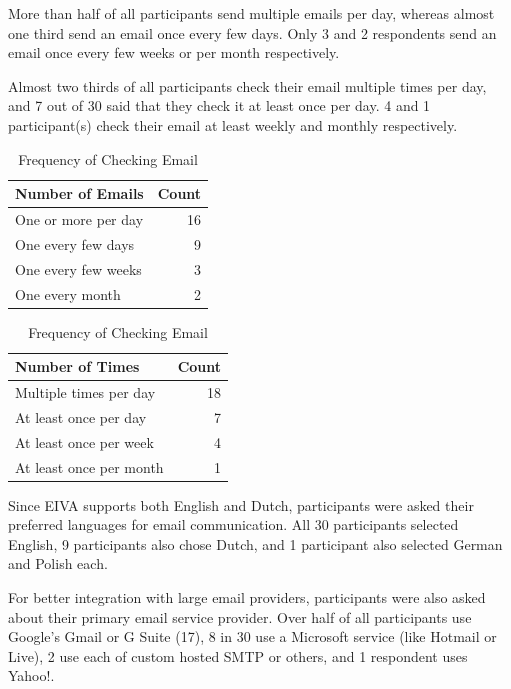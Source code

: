\documentclass{article}
\begin{document}
More than half of all participants send multiple emails per day, whereas almost one third send an email once every few days. Only 3 and 2 respondents send an email once every few weeks or per month respectively.

Almost two thirds of all participants check their email multiple times per day, and 7 out of 30 said that they check it at least once per day. 4 and 1 participant(s) check their email at least weekly and monthly respectively.

\begin{table}[!htb]
	\begin{minipage}{.5\linewidth}
		\caption{Frequency of Emails Sent}
		\centering
		\begin{tabular}{lr}
			\hline
			\textbf{Number of Emails} & \textbf{Count} \\
			\hline
			One or more per day       & 16             \\
			One every few days        & 9              \\
			One every few weeks       & 3              \\
			One every month           & 2              \\
			\hline
		\end{tabular}
	\end{minipage}%
	\hspace{.1cm}
	\begin{minipage}{.5\linewidth}
		\centering
		\caption{Frequency of Checking Email}
		\begin{tabular}{lr}
			\hline
			\textbf{Number of Times} & \textbf{Count} \\
			\hline
			Multiple times per day   & 18             \\
			At least once per day    & 7              \\
			At least once per week   & 4              \\
			At least once per month  & 1              \\
			\hline
		\end{tabular}
	\end{minipage} 
\end{table}

Since EIVA supports both English and Dutch, participants were asked their preferred languages for email communication. All 30 participants selected English, 9 participants also chose Dutch, and 1 participant also selected German and Polish each.

For better integration with large email providers, participants were also asked about their primary email service provider. Over half of all participants use Google's Gmail or G Suite (17), 8 in 30 use a Microsoft service (like Hotmail or Live), 2 use each of custom hosted SMTP or others, and 1 respondent uses Yahoo!.
\end{document}
